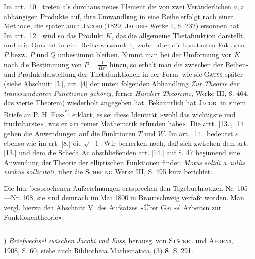 \par\indent Im art. [10.] treten als durchaus neues Element die von zwei Veränderlichen $a,z$ abhängigen Produkte auf, ihre Umwandlung in eine Reihe erfolgt nach einer Methode, die später auch \textsc{Jacobi} (1829, \textsc{Jacobis} Werke I, S. 232) ersonnen hat. Im art. [12.] wird so das Produkt $K$, das die allgemeine Thetafunktion darstellt, und sein Quadrat in eine Reihe verwandelt, wobei aber die konstanten Faktoren $P$ bezw. $P$ und $Q$ unbestimmt bleiben. Nimmt man bei der Umformung von $K$ noch die Bestimmung von $P=\frac1{\Pi x^2}$ hinzu, so erhält man die  zwischen der Reihen- und Produktdarstellung der Thetafunktionen in der Form, wie sie \textsc{Gauss} später (siehe Abschnitt [I.], art. [4] der unten folgenden Abhandlung \textit{Zur Theorie der transscendenten Functionen gehörig}, ferner \textit{Hundert Theoreme}, Werke III, S. 464, das vierte Theorem) wiederholt angegeben hat. Bekanntlich hat \textsc{Jacobi} in einem Briefe an P. H. \textsc{Fuss}\textsuperscript{*)} erklärt, es sei diese Identität »wohl das wichtigste und fruchtbarste«, was er »in reiner Mathematik erfunden habe«. Die artt. [13.], [14.] geben die Anwendungen auf die Funktionen $T$ und $W$. Im art. [14.] bedeutet $\varepsilon$ ebenso wie im art. [8.] die $\sqrt{-1}$. Wir bemerken noch, daß sich zwischen dem art. [13.] und dem die Scheda Ac abschließenden art. [14.] auf S. 47 beginnend eine Anwendung der Theorie der elliptischen Funktionen findet: \textit{Motus solidi a nullis viribus sollicitati}, über die \textsc{Schering} Werke III, S. 495 kurz berichtet.
\par\indent Die hier besprochenen Aufzeichnungen entsprechen den Tagebuchnotizen Nr. 105—Nr. 108, sie sind demnach im Mai 1800 in Braunschweig verfaßt worden. Man vergl. hierzu den Abschnitt V. des Aufsatzes »Über \textsc{Gauss}' Arbeiten zur Funktionentheorie«.
\par\smallskip\noindent\rule{.25\linewidth}{.4pt}\par
{\small
\par\indent *) \textit{Briefwechsel zwischen Jacobi und Fuss}, herausg. von \textsc{Stäckel} und \textsc{Ahrens}, 1908, S. 60, siehe auch Bibliotheca Mathematica, (3) \textbf{8}, S. 291.
\par}
\clearpage
\endgroup

